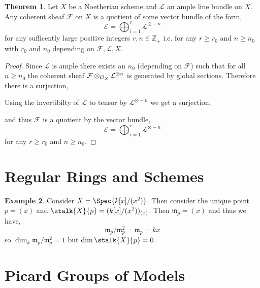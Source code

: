 \documentclass[12pt]{extarticle}
\newcommand{\Z}{\mathbb{Z}}
\theoremstyle{definition}
\newtheorem{theorem}{Theorem}[section]
\newtheorem{example}[theorem]{Example}
\newcommand{\F}{\mathcal{F}}
\newcommand{\m}{\mathfrak{m}}
\begin{document}
\newcommand{\E}{\mathcal{E}}
\renewcommand{\L}{\mathcal{L}}

\begin{theorem}
Let $X$ be a Noetherian scheme and $\L$ an ample line bundle on $X$. Any coherent sheaf $\F$ on $X$ is a quotient of some vector bundle of the form,
\[ \E = \bigoplus_{i = 1}^r \L^{\otimes -n} \]
for any sufficently large positive integers $r, n \in \Z_{+}$ i.e. for any $r \ge r_0$ and $n \ge n_0$ with $r_0$ and $n_0$ depending on $\F, \L, X$. 
\end{theorem}

\begin{proof}
Since $\L$ is ample there exists an $n_0$ (depending on $\F$) such that for all $n \ge n_0$ the coherent sheaf $\F \otimes_{\struct{X}} \L^{\otimes n}$ is generated by global sections. Therefore there is a surjection,
\begin{center}
\end{center}
Using the invertibilty of $\L$ to tensor by $\L^{\otimes - n}$ we get a surjection,
\begin{center}
\end{center}
and thus $\F$ is a quotient by the vector bundle,
\[ \E = \bigoplus_{i = 1}^r \L^{\otimes -n} \]
for any $r \ge r_0$ and $n \ge n_0$. 
\end{proof}

\section{Regular Rings and Schemes}

\begin{example}
Consider $X = \Spec{k[x]/(x^2)}$. Then consider the unique point $p = (x)$ and $\stalk{X}{p} = (k[x]/(x^2))_{(x)}$. Then $\m_p = (x)$ and thus we have,
\[ \m_p / \m_p^2 = \m_p = k x \]
so $\dim_k \m_p / \m_p^2 = 1$ but $\dim{\stalk{X}{p}} = 0$. 
\end{example}


\section{Picard Groups of Models}
\end{document}
